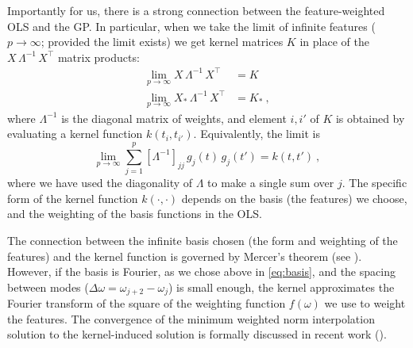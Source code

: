\documentclass[12pt,letterpaper]{article}
\begin{document}
Importantly for us, there is a strong connection between the feature-weighted OLS and the GP.
In particular, when we take the limit of infinite features ($p\to\infty$; provided the limit exists) we get kernel matrices $K$ in place of the $X\,\Lambda^{-1}\,X^\top$ matrix products:
\begin{align}
    \lim_{p\to\infty} X\,\Lambda^{-1}\,X^\top &= K
    \\
    \lim_{p\to\infty} X_\ast\,\Lambda^{-1}\,X^\top &= K_\ast
    ~,
    \label{eq.limit}
\end{align}
where $\Lambda^{-1}$ is the diagonal matrix of weights, and element $i,i'$ of $K$ is obtained by evaluating a kernel function $k(t_i,t_{i'})$.
Equivalently, the limit is
\begin{equation}
    \lim_{p\to\infty} \sum_{j=1}^p [\Lambda^{-1}]_{jj}\,g_j(t)\,g_{j}(t') = k(t, t')
    ~,
\end{equation}
where we have used the diagonality of $\Lambda$ to make a single sum over $j$.
The specific form of the kernel function $k(\cdot,\cdot)$ depends on the basis (the features) we choose, and the weighting of the basis functions in the OLS. 

The connection between the infinite basis chosen (the form and weighting of the features) and the kernel function is governed by Mercer's theorem (see \citealt{minh2006mercer}).
However, if the basis is Fourier, as we chose above in \eqref{eq:basis}, and the spacing between modes ($\Delta\omega =\omega_{j+2}-\omega_j$) is small enough, the kernel approximates the Fourier transform of the square of the weighting function $f(\omega)$ we use to weight the features. The convergence of the minimum weighted norm interpolation solution to the kernel-induced solution is formally discussed in recent work (\citealt{li2020generalization}).
\end{document}
